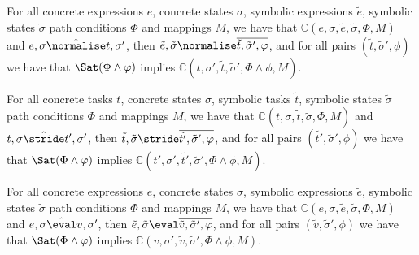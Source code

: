 \begin{lemma}
  \label{lem:completeNormalise}
  For all concrete expressions $e$, concrete states $\sigma$, symbolic expressions $\tilde{e}$, symbolic states $\tilde{\sigma}$ path conditions $\Phi$ and mappings $M$,
  we have that $\mathds{C}(e,\sigma,\tilde{e},\tilde{\sigma},\Phi,M)$
  and $e,\sigma\hat{\normalise} t,\sigma'$,
  then $\tilde{e},\tilde{\sigma}\normalise\overline{\tilde{t},\tilde{\sigma}',\phi}$,
  and for all pairs $(\tilde{t},\tilde{\sigma}',\phi)$ we have that $\Sat(\Phi\land\phi)$ implies $\mathds{C}(t,\sigma',\tilde{t},\tilde{\sigma}',\Phi\land\phi,M)$.
\end{lemma}

\begin{lemma}
  \label{lem:completeStride}
  For all concrete tasks $t$, concrete states $\sigma$, symbolic tasks $\tilde{t}$, symbolic states $\tilde{\sigma}$ path conditions $\Phi$ and mappings $M$,
  we have that $\mathds{C}(t,\sigma,\tilde{t},\tilde{\sigma},\Phi,M)$
  and $t,\sigma\hat{\stride} t',\sigma'$,
  then $\tilde{t},\tilde{\sigma}\stride\overline{\tilde{t'},\tilde{\sigma}',\phi}$,
  and for all pairs $(\tilde{t'},\tilde{\sigma}',\phi)$ we have that $\Sat(\Phi\land\phi)$ implies $\mathds{C}(t',\sigma',\tilde{t'},\tilde{\sigma}',\Phi\land\phi,M)$.
\end{lemma}

\begin{lemma}
  \label{lem:completeEval}
  For all concrete expressions $e$, concrete states $\sigma$, symbolic expressions $\tilde{e}$, symbolic states $\tilde{\sigma}$ path conditions $\Phi$ and mappings $M$,
  we have that $\mathds{C}(e,\sigma,\tilde{e},\tilde{\sigma},\Phi,M)$
  and $e,\sigma\hat{\eval} v,\sigma'$,
  then $\tilde{e},\tilde{\sigma}\eval\overline{\tilde{v},\tilde{\sigma}',\phi}$,
  and for all pairs $(\tilde{v},\tilde{\sigma}',\phi)$ we have that $\Sat(\Phi\land\phi)$ implies $\mathds{C}(v,\sigma',\tilde{v},\tilde{\sigma}',\Phi\land\phi,M)$.
\end{lemma}

